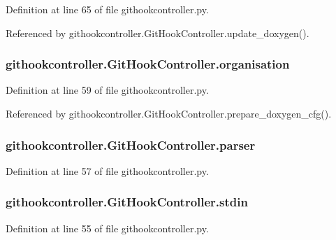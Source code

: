 Definition at line 65 of file githookcontroller.\-py.



Referenced by githookcontroller.\-Git\-Hook\-Controller.\-update\-\_\-doxygen().

\subsubsection[{organisation}]{\setlength{\rightskip}{0pt plus 5cm}githookcontroller.\-Git\-Hook\-Controller.\-organisation}\label{classgithookcontroller_1_1GitHookController_a0600f5f58184170fa103c486691cde5e}


Definition at line 59 of file githookcontroller.\-py.



Referenced by githookcontroller.\-Git\-Hook\-Controller.\-prepare\-\_\-doxygen\-\_\-cfg().

\subsubsection[{parser}]{\setlength{\rightskip}{0pt plus 5cm}githookcontroller.\-Git\-Hook\-Controller.\-parser}\label{classgithookcontroller_1_1GitHookController_abb66a7d13f82d794351fc72184c92aa6}


Definition at line 57 of file githookcontroller.\-py.

\subsubsection[{stdin}]{\setlength{\rightskip}{0pt plus 5cm}githookcontroller.\-Git\-Hook\-Controller.\-stdin}\label{classgithookcontroller_1_1GitHookController_a2979702282896092040b9e3adff073e5}


Definition at line 55 of file githookcontroller.\-py.

